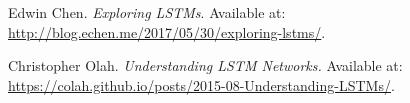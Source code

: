 
 Edwin Chen. \emph{Exploring LSTMs}. Available at:
\url{http://blog.echen.me/2017/05/30/exploring-lstms/}.

 Christopher Olah. \emph{Understanding LSTM Networks.} Available at:
\url{https://colah.github.io/posts/2015-08-Understanding-LSTMs/}.

